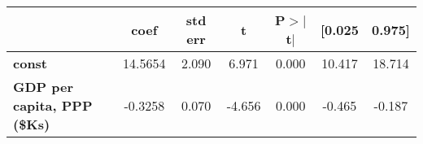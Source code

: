 \begin{center}
\begin{tabular}{lcccccc}
\toprule
                                    & \textbf{coef} & \textbf{std err} & \textbf{t} & \textbf{P$> |$t$|$} & \textbf{[0.025} & \textbf{0.975]}  \\
\midrule
\textbf{const}                      &      14.5654  &        2.090     &     6.971  &         0.000        &       10.417    &       18.714     \\
\textbf{GDP per capita, PPP (\$Ks)} &      -0.3258  &        0.070     &    -4.656  &         0.000        &       -0.465    &       -0.187     \\
\bottomrule
\end{tabular}
\end{center}